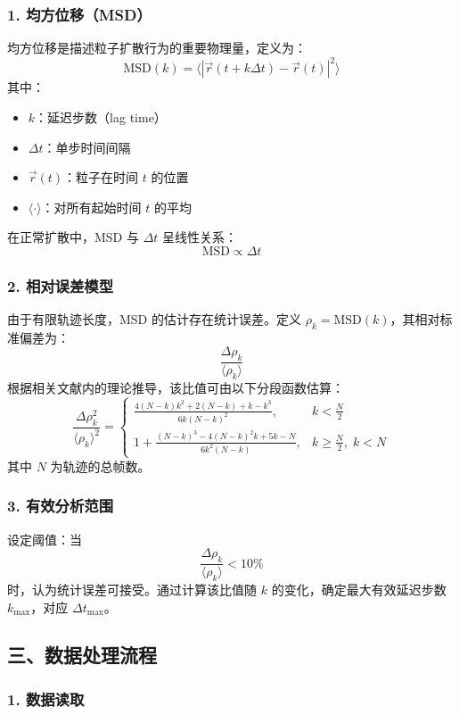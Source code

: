 \documentclass[a4paper]{report} %
\begin{document}
\subsubsection*{1. 均方位移（MSD）}
均方位移是描述粒子扩散行为的重要物理量，定义为：
\[
\text{MSD}(k) = \langle |\vec{r}(t + k\Delta t) - \vec{r}(t)|^2 \rangle
\]
其中：
\begin{itemize}
    \item $k$：延迟步数（lag time）
    \item $\Delta t$：单步时间间隔
    \item $\vec{r}(t)$：粒子在时间 $t$ 的位置
    \item $\langle \cdot \rangle$：对所有起始时间 $t$ 的平均
\end{itemize}
在正常扩散中，MSD 与 $\Delta t$ 呈线性关系：
\[
\text{MSD} \propto \Delta t
\]
\subsubsection*{2. 相对误差模型}
由于有限轨迹长度，MSD 的估计存在统计误差。定义 $\rho_k = \text{MSD}(k)$，其相对标准偏差为：
\[
\frac{\Delta \rho_k}{\langle \rho_k \rangle}
\]
根据相关文献内的理论推导\cite{qian1991spt}，该比值可由以下分段函数估算：
\[
\frac{\Delta \rho_k^2}{\langle \rho_k \rangle^2} =
\begin{cases}
\displaystyle \frac{4(N-k)k^2 + 2(N-k) + k - k^3}{6k(N-k)^2}, & k < \tfrac{N}{2} \\[2ex]
\displaystyle 1 + \frac{(N-k)^3 - 4(N-k)^2 k + 5k - N}{6k^2(N-k)}, & k \geq \tfrac{N}{2},\; k < N
\end{cases}
\]
其中 $N$ 为轨迹的总帧数。

\subsubsection*{3. 有效分析范围}

设定阈值：当 
\[
\frac{\Delta \rho_k}{\langle \rho_k \rangle} < 10\%
\] 
时，认为统计误差可接受。通过计算该比值随 $k$ 的变化，确定最大有效延迟步数 $k_{\text{max}}$，对应 $\Delta t_{\text{max}}$。

\subsection*{三、数据处理流程}

\subsubsection*{1. 数据读取}
\end{document}
